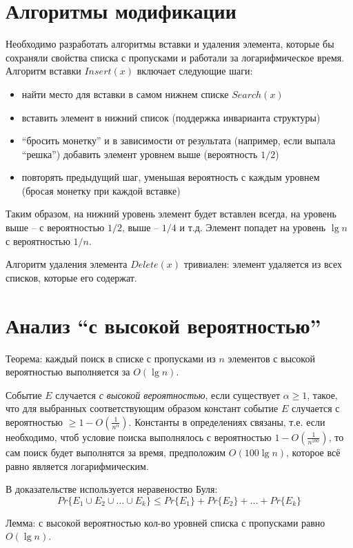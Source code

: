 \documentclass[11pt]{article}
\begin{document}
\section{Алгоритмы модификации}
Необходимо разработать алгоритмы вставки и удаления элемента, которые бы сохраняли свойства списка с пропусками и работали за логарифмическое время. Алгоритм вставки $Insert(x)$ включает следующие шаги:
\begin{itemize}
\item найти место для вставки в самом нижнем списке $Search(x)$
\item вставить элемент в нижний список (поддержка инварианта структуры)
\item ``бросить монетку'' и в зависимости от результата (например, если выпала ``решка'') добавить элемент уровнем выше (вероятность $1/2$)
\item повторять предыдущий шаг, уменьшая вероятность с каждым уровнем (бросая монетку при каждой вставке)
\end{itemize}
Таким образом, на нижний уровень элемент будет вставлен всегда, на уровень выше -- с вероятностью $1/2$, выше -- $1/4$ и т.д. Элемент попадет на уровень $\lg n$ с вероятностью $1/n$.

Алгоритм удаления элемента $Delete(x)$ тривиален: элемент удаляется из всех списков, которые его содержат.

\section{Анализ ``с высокой вероятностью''}
Теорема: каждый поиск в списке с пропусками из $n$ элементов с высокой вероятностью выполняется за $O(\lg n)$.

Событие $E$ случается \emph{с высокой вероятностью}, если существует $\alpha \geqslant 1$, такое, что для выбранных соответствующим образом констант событие $E$ случается с вероятностью $\geqslant 1 - O(\frac{1}{n^{\alpha}})$. Константы в определениях связаны, т.е. если необходимо, чтоб условие поиска выполнялось с вероятностью  $1 - O(\frac{1}{n^100})$, то сам поиск будет выполнятся за время, предположим $O(100 \lg n)$, которое всё равно является логарифмическим.

В доказательстве используется неравеноство Буля:
\begin{equation*}
  Pr\{E_1 \cup E_2 \cup \ldots \cup E_k\} \leqslant Pr\{E_1\} + Pr\{E_2\} + \ldots + Pr\{E_k\}
\end{equation*}

Лемма: с высокой вероятностью кол-во уровней списка с пропусками равно $O(\lg n)$. 
\end{document}
